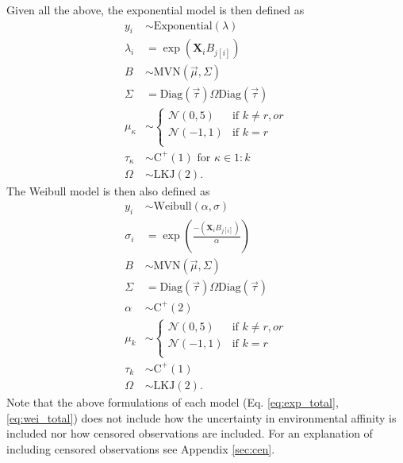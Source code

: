 \documentclass[12pt,letterpaper]{article}
\begin{document}
Given all the above, the exponential model is then defined as
\begin{equation}
  \begin{aligned}
    y_{i} &\sim \mathrm{Exponential}(\lambda) \\
    \lambda_{i} &= \exp(\mathbf{X}_{i} B_{j[i]}) \\
    B &\sim \mathrm{MVN}(\vec{\mu}, \Sigma) \\
    \Sigma &= \text{Diag}(\vec{\tau}) \Omega \text{Diag}(\vec{\tau}) \\
    \mu_{\kappa} &\sim 
    \begin{cases} 
      \mathcal{N}(0, 5) & \text{if } k \neq r, or \\
      \mathcal{N}(-1, 1) & \text{if } k = r \\  %
    \end{cases} \\
    \tau_{\kappa} &\sim \mathrm{C^{+}}(1) \text{ for } \kappa \in 1:k \\
    \Omega &\sim \text{LKJ}(2).
  \end{aligned}
  \label{eq:exp_total}
\end{equation}
The Weibull model is then also defined as
\begin{equation}
  \begin{aligned}
    y_{i} &\sim \mathrm{Weibull}(\alpha, \sigma) \\
    \sigma_{i} &= \exp\left(\frac{-(\mathbf{X}_{i} B_{j[i]})}{\alpha}\right) \\
    B &\sim \mathrm{MVN}(\vec{\mu}, \Sigma) \\
    \Sigma &= \text{Diag}(\vec{\tau}) \Omega \text{Diag}(\vec{\tau}) \\
    \alpha &\sim \mathrm{C^{+}}(2) \\
    \mu_{k} &\sim 
    \begin{cases} 
      \mathcal{N}(0, 5) & \text{if } k \neq r, or \\
      \mathcal{N}(-1, 1) & \text{if } k = r \\  %
    \end{cases} \\
    \tau_{k} &\sim \mathrm{C^{+}}(1) \\
    \Omega &\sim \text{LKJ}(2).
  \end{aligned}
  \label{eq:wei_total}
\end{equation}
Note that the above formulations of each model (Eq. \ref{eq:exp_total}, \ref{eq:wei_total}) does not include how the uncertainty in environmental affinity is included nor how censored observations are included. For an explanation of including censored observations see Appendix \ref{sec:cen}.
\end{document}
